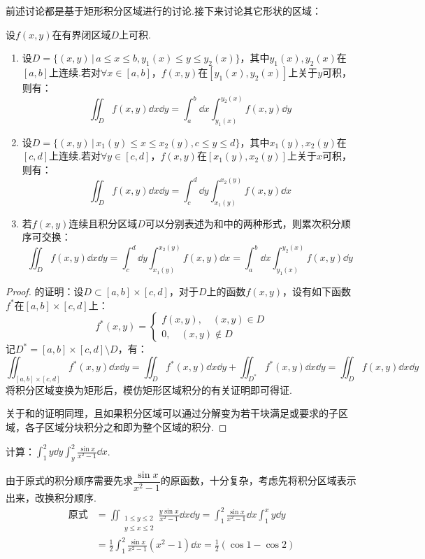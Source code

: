 前述讨论都是基于矩形积分区域进行的讨论.接下来讨论其它形状的区域：
\begin{theorem}
    设$f(x,y)$在有界闭区域$D$上可积.
    \begin{enumerate}[circ]
        \item 设$D = \{(x,y)\,|\,a \leqslant x \leqslant b,y_1(x)\leqslant y \leqslant y_2(x)\}$，其中$y_1(x),y_2(x)$在$[a,b]$上连续.若对$\forall x \in[a,b]$，$f(x,y)$在$[y_1(x),y_2(x)]$上关于$y$可积，则有：
        \[\iint_D f(x,y)\dd{x}\dd{y} = \int_{a}^{b}\dd{x}\int_{y_1(x)}^{y_2(x)}f(x,y)\dd{y}\]
        \item 设$D = \{(x,y)\,|\,x_1(y) \leqslant x \leqslant x_2(y),c \leqslant y \leqslant d\}$，其中$x_1(y),x_2(y)$在$[c,d]$上连续.若对$\forall y \in[c,d]$，$f(x,y)$在$[x_1(y),x_2(y)]$上关于$x$可积，则有：
        \[\iint_D f(x,y)\dd{x}\dd{y} = \int_{c}^{d}\dd{y}\int_{x_1(y)}^{x_2(y)}f(x,y)\dd{x}\]
        \item 若$f(x,y)$连续且积分区域$D$可以分别表述为和中的两种形式，则累次积分顺序可交换：
        \[\iint_D f(x,y)\dd{x}\dd{y} = \int_{c}^{d}\dd{y}\int_{x_1(y)}^{x_2(y)}f(x,y)\dd{x} = \int_{a}^{b}\dd{x}\int_{y_1(x)}^{y_2(x)}f(x,y)\dd{y}\]
    \end{enumerate}
\end{theorem}

\begin{proof}
    的证明：设$D \subset [a,b]\times[c,d]$，对于$D$上的函数$f(x,y)$，设有如下函数$f^*$在$[a,b]\times[c,d]$上：
    \[f^*(x,y) = \begin{cases}
        f(x,y),\quad (x,y)\in D \\
        0,\quad (x,y)\notin D
    \end{cases}\]
    记$D^* = [a,b]\times[c,d] \setminus D$，有：
    \[\iint_{[a,b]\times[c,d]}f^*(x,y)\dd{x}\dd{y} = \iint_D\!\! f^*(x,y)\dd{x}\dd{y} + \iint_{D^*}\!\!f^*(x,y)\dd{x}\dd{y} = \iint_D\!\! f(x,y)\dd{x}\dd{y}\]
    将积分区域变换为矩形后，模仿矩形区域积分的有关证明即可得证.

    关于和的证明同理，且如果积分区域可以通过分解变为若干块满足或要求的子区域，各子区域分块积分之和即为整个区域的积分.
\end{proof}

\begin{question}
    计算：$\displaystyle\int_{1}^{2}y\dd{y}\int_{y}^{2}\frac{\sin x}{x^2-1}\dd{x}$.
\end{question}

\begin{solution}
    由于原式的积分顺序需要先求$\dfrac{\sin x}{x^2-1}$的原函数，十分复杂，考虑先将积分区域表示出来，改换积分顺序.
    \begin{align*}
        \text{原式} &= \iint_{\,\substack{1\leqslant y \leqslant 2 \\ y\leqslant x \leqslant 2}}\frac{y \sin x}{x^2-1}\dd{x}\dd{y} = \int_{1}^{2}\frac{\sin x}{x^2-1}\dd{x}\int_{1}^{x}y\dd{y} \\
        &= \frac{1}{2}\int_{1}^{2}\frac{\sin x}{x^2-1}(x^2-1)\dd{x} = \frac{1}{2}(\cos 1 - \cos 2)
    \end{align*}
\end{solution}

